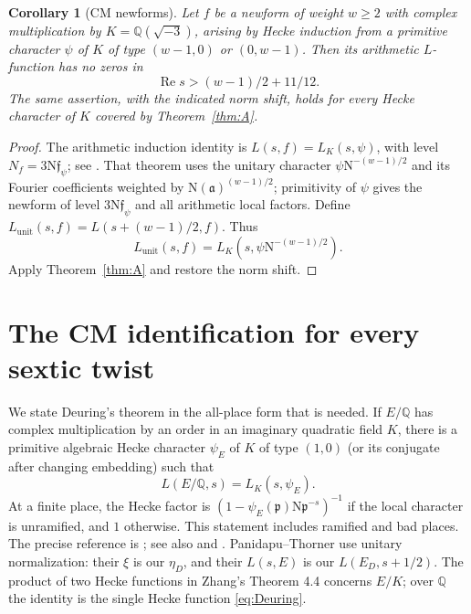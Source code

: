 \documentclass[11pt,a4paper]{article}
\numberwithin{equation}{section}
\newtheorem{corollary}[theorem]{Corollary}
\theoremstyle{definition}
\theoremstyle{remark}
\newcommand{\Q}{\mathbb Q}
\newcommand{\N}{\mathrm N}
\newcommand{\Rea}{\operatorname{Re}}
\begin{document}
\begin{corollary}[CM newforms]\label{cor:newforms}
Let $f$ be a newform of weight $w\ge2$ with complex multiplication by $K=\Q(\sqrt{-3})$, arising by Hecke induction from a primitive character $\psi$ of $K$ of type $(w-1,0)$ or $(0,w-1)$. Then its arithmetic $L$-function has no zeros in
\[
 \Rea s>(w-1)/2+11/12.
\]
The same assertion, with the indicated norm shift, holds for every Hecke character of $K$ covered by Theorem~\ref{thm:A}.
\end{corollary}
\begin{proof}
The arithmetic induction identity is $L(s,f)=L_K(s,\psi)$, with level $N_f=3\N\mathfrak f_\psi$; see \cite[Section 12.3, Theorem 12.5 and its following remark, pp.~211--214]{Iwaniec}. That theorem uses the unitary character $\psi\N^{-(w-1)/2}$ and its Fourier coefficients weighted by $\N(\mathfrak a)^{(w-1)/2}$; primitivity of $\psi$ gives the newform of level $3\N\mathfrak f_\psi$ and all arithmetic local factors. Define $L_{\mathrm{unit}}(s,f)=L(s+(w-1)/2,f)$. Thus
\[
 L_{\mathrm{unit}}(s,f)=L_K(s,\psi\N^{-(w-1)/2}).
\]
Apply Theorem~\ref{thm:A} and restore the norm shift.
\end{proof}

\section{The CM identification for every sextic twist}\label{sec:CM}
We state Deuring's theorem in the all-place form that is needed. If $E/\Q$ has complex multiplication by an order in an imaginary quadratic field $K$, there is a primitive algebraic Hecke character $\psi_E$ of $K$ of type $(1,0)$ (or its conjugate after changing embedding) such that
\begin{equation}\label{eq:Deuring}
 L(E/\Q,s)=L_K(s,\psi_E).
\end{equation}
At a finite place, the Hecke factor is $(1-\psi_E(\mathfrak p)\N\mathfrak p^{-s})^{-1}$ if the local character is unramified, and $1$ otherwise. This statement includes ramified and bad places. The precise reference is \cite[Theorem 4.5, and the local definition following Theorem 4.4, pp.~26--27]{Zhang}; see also \cite[Chapter II, Theorem 10.5]{Silverman} and \cite[Theorem 2.2]{PT}. Panidapu--Thorner use unitary normalization: their $\xi$ is our $\eta_D$, and their $L(s,E)$ is our $L(E_D,s+1/2)$. The product of two Hecke functions in Zhang's Theorem 4.4 concerns $E/K$; over $\Q$ the identity is the single Hecke function \eqref{eq:Deuring}.
\end{document}
